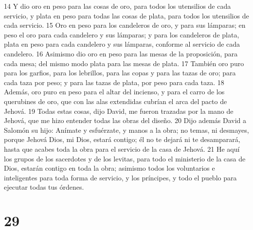 14 Y dio oro en peso para las cosas de oro, para todos los utensilios de cada servicio, y plata en peso para todas las cosas de plata, para todos los utensilios de cada servicio.
15 Oro en peso para los candeleros de oro, y para sus lámparas; en peso el oro para cada candelero y sus lámparas; y para los candeleros de plata, plata en peso para cada candelero y sus lámparas, conforme al servicio de cada candelero.
16 Asimismo dio oro en peso para las mesas de la proposición, para cada mesa; del mismo modo plata para las mesas de plata.
17 También oro puro para los garfios, para los lebrillos, para las copas y para las tazas de oro; para cada taza por peso; y para las tazas de plata, por peso para cada taza.
18 Además, oro puro en peso para el altar del incienso, y para el carro de los querubines de oro, que con las alas extendidas cubrían el arca del pacto de Jehová.
19 Todas estas cosas, dijo David, me fueron trazadas por la mano de Jehová, que me hizo entender todas las obras del diseño.
20 Dijo además David a Salomón su hijo: Anímate y esfuérzate, y manos a la obra; no temas, ni desmayes, porque Jehová Dios, mi Dios, estará contigo; él no te dejará ni te desamparará, hasta que acabes toda la obra para el servicio de la casa de Jehová.
21 He aquí los grupos de los sacerdotes y de los levitas, para todo el ministerio de la casa de Dios, estarán contigo en toda la obra; asimismo todos los voluntarios e inteligentes para toda forma de servicio, y los príncipes, y todo el pueblo para ejecutar todas tus órdenes.

\chapter{29}

